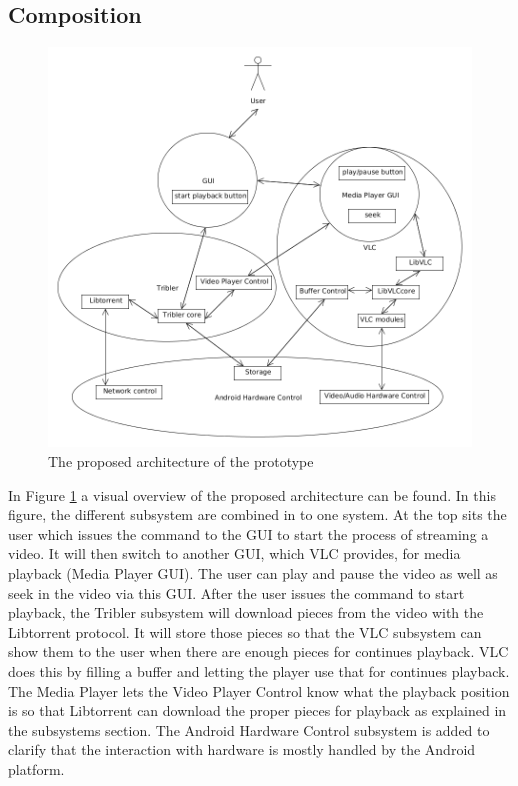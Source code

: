 \subsection{Composition}
\label{sec:comp}
\begin{figure}[h!]
	\includegraphics[scale=0.47]{images/architecture_overview.png}
	\caption{The proposed architecture of the prototype}
	\label{fig:prop_arch}
\end{figure}
In Figure \ref{fig:prop_arch} a visual overview of the proposed architecture can be found. In this figure, the different subsystem are combined in to one system. At the top sits the user which issues the command to the GUI to start the process of streaming a video. It will then switch to another GUI, which VLC provides, for media playback (Media Player GUI). The user can play and pause the video as well as seek in the video via this GUI. After the user issues the command to start playback, the Tribler subsystem will download pieces from the video with the Libtorrent protocol. It will store those pieces so that the VLC subsystem can show them to the user when there are enough pieces for continues playback. VLC does this by filling a buffer and letting the player use that for continues playback. The Media Player lets the Video Player Control know what the playback position is so that Libtorrent can download the proper pieces for playback as explained in the subsystems section. The Android Hardware Control subsystem is added to clarify that the interaction with hardware is mostly handled by the Android platform.